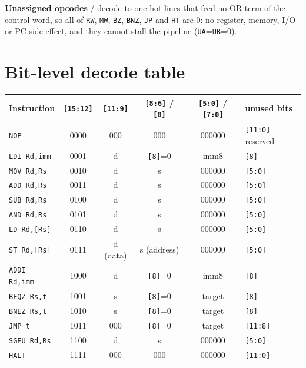 \documentclass[10pt,a4paper]{article}
\begin{document}
\textbf{Unassigned opcodes} / decode to one-hot lines that feed no OR term of the control word, so
all of \texttt{RW}, \texttt{MW}, \texttt{BZ}, \texttt{BNZ}, \texttt{JP} and \texttt{HT} are 0: no register, memory, I/O or PC side effect, and
they cannot stall the pipeline (\texttt{UA}=\texttt{UB}=0).

\section{Bit-level decode table}
\begin{center}
\small
\begin{tabular}{l c c c c l}
\toprule
Instruction & \texttt{[15:12]} & \texttt{[11:9]} & \texttt{[8:6]} / \texttt{[8]} & \texttt{[5:0]} / \texttt{[7:0]} & unused bits \\
\midrule
\texttt{NOP}           & 0000 & 000 & 000 & 000000 & \texttt{[11:0]} reserved\\
\texttt{LDI Rd,imm}    & 0001 & d   & \texttt{[8]}=0 & imm8 & \texttt{[8]}\\
\texttt{MOV Rd,Rs}     & 0010 & d   & s   & 000000 & \texttt{[5:0]}\\
\texttt{ADD Rd,Rs}     & 0011 & d   & s   & 000000 & \texttt{[5:0]}\\
\texttt{SUB Rd,Rs}     & 0100 & d   & s   & 000000 & \texttt{[5:0]}\\
\texttt{AND Rd,Rs}     & 0101 & d   & s   & 000000 & \texttt{[5:0]}\\
\texttt{LD Rd,[Rs]}    & 0110 & d   & s   & 000000 & \texttt{[5:0]}\\
\texttt{ST Rd,[Rs]}    & 0111 & d (data) & s (address) & 000000 & \texttt{[5:0]}\\
\texttt{ADDI Rd,imm}   & 1000 & d   & \texttt{[8]}=0 & imm8 & \texttt{[8]}\\
\texttt{BEQZ Rs,t}     & 1001 & s   & \texttt{[8]}=0 & target & \texttt{[8]}\\
\texttt{BNEZ Rs,t}     & 1010 & s   & \texttt{[8]}=0 & target & \texttt{[8]}\\
\texttt{JMP t}         & 1011 & 000 & \texttt{[8]}=0 & target & \texttt{[11:8]}\\
\texttt{SGEU Rd,Rs}    & 1100 & d   & s   & 000000 & \texttt{[5:0]}\\
\texttt{HALT}          & 1111 & 000 & 000 & 000000 & \texttt{[11:0]}\\
\bottomrule
\end{tabular}
\end{center}
\end{document}
